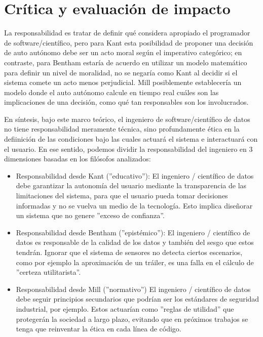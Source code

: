 \section{Crítica y evaluación de impacto}
La responsabilidad es tratar de definir qué considera apropiado el programador de software/científico, pero para Kant esta posibilidad de proponer una decisión de auto autónomo debe ser un acto moral según el imperativo categórico; en contraste, para Bentham estaría de acuerdo en utilizar un modelo matemático para definir un nivel de moralidad, no se negaría como Kant al decidir si el sistema comete un acto menos perjudicial. Mill posiblemente establecería un modelo donde el auto autónomo calcule en tiempo real cuáles son las implicaciones de una decisión, como qué tan responsables son los involucrados.

\medskip

En síntesis, bajo este marco teórico, el ingeniero de software/científico de datos no tiene responsabilidad meramente técnica, sino profundamente ética en la defiinición de las condiciones bajo las cuales actuará el sistema e interactuará con el usuario. En ese sentido, podemos dividir la responsabilidad del ingeniero en 3 dimensiones basadas en los filósofos analizados:   
\begin{itemize}
    \item Responsabilidad desde Kant (''educativo''):
    El ingeniero / científico de datos debe garantizar la autonomía del usuario mediante la transparencia de las limitaciones del sistema, para que el usuario pueda tomar decisiones informadas y no se vuelva un medio de la tecnología. Esto implica diseñorar un sistema que no genere ''exceso de confianza''. 
    \item Responsabilidad desde Bentham (''epistémico''):
    El ingeniero / científico de datos es responsable de la calidad de los datos y también del sesgo que estos tendrán. Ignorar que el sistema de sensores no detecta ciertos escenarios, como por ejemplo la aproximación de un tráiler, es una falla en el cálculo de ''certeza utilitarista''.

    \item Responsabilidad desde Mill (''normativo'')
    El ingeniero / científico de datos debe seguir principios secundarios que podrían ser los estándares de seguridad industrial, por ejemplo. Estos actuarían como ''reglas de utilidad'' que protegerán la sociedad a largo plazo, evitando que en próximos trabajos se tenga que reinventar la ética en cada línea de código.
\end{itemize}